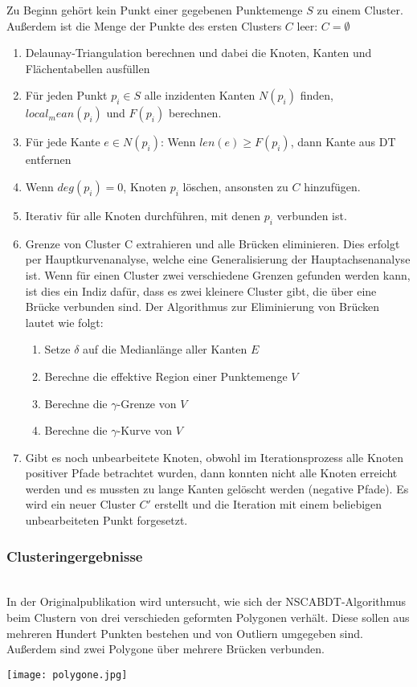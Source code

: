 \documentclass[11pt,ceqn]{book}
\begin{document}
Zu Beginn gehört kein Punkt einer gegebenen Punktemenge $S$ zu einem Cluster. Außerdem ist die Menge der Punkte des ersten Clusters $C$ leer: $C=\emptyset$
\begin{enumerate}
\item Delaunay-Triangulation berechnen und dabei die Knoten, Kanten und Flächentabellen ausfüllen
\item Für jeden Punkt $p_i \in S$ alle inzidenten Kanten $N(p_i)$ finden, $local_mean(p_i)$ und $F(p_i)$ berechnen.
\item Für jede Kante $e \in N(p_i)$: Wenn $len(e) \geqslant F(p_i)$, dann Kante aus DT entfernen
\item Wenn $deg(p_i)=0$, Knoten $p_i$ löschen, ansonsten zu $C$ hinzufügen.
\item Iterativ für alle Knoten durchführen, mit denen $p_i$ verbunden ist.
\item Grenze von Cluster C extrahieren und alle Brücken eliminieren. Dies erfolgt per Hauptkurvenanalyse, welche eine Generalisierung der Hauptachsenanalyse ist. Wenn für einen Cluster zwei verschiedene Grenzen gefunden werden kann, ist dies ein Indiz dafür, dass es zwei kleinere Cluster gibt, die über eine Brücke verbunden sind. Der Algorithmus zur Eliminierung von Brücken lautet wie folgt:
\begin{enumerate}
\item Setze $\delta$ auf die Medianlänge aller Kanten $E$
\item Berechne die effektive Region einer Punktemenge $V$
\item Berechne die $\gamma$-Grenze von $V$
\item Berechne die $\gamma$-Kurve von $V$
\end{enumerate}
\item Gibt es noch unbearbeitete Knoten, obwohl im Iterationsprozess alle Knoten positiver Pfade betrachtet wurden, dann konnten nicht alle Knoten erreicht werden und es mussten zu lange Kanten gelöscht werden (negative Pfade). Es wird ein neuer Cluster $C'$ erstellt und die Iteration mit einem beliebigen unbearbeiteten Punkt forgesetzt.
\end{enumerate}



\begin{minipage}{0.45\textwidth}\raggedright
\subsubsection{Clusteringergebnisse} ~\\
In der Originalpublikation wird untersucht, wie sich der NSCABDT-Algorithmus beim Clustern von drei verschieden geformten Polygonen verhält. Diese sollen aus mehreren Hundert Punkten bestehen und von Outliern umgegeben sind. Außerdem sind zwei Polygone über mehrere Brücken verbunden.
\end{minipage}
\hfill
\begin{minipage}{0.5\textwidth}
\texttt{[image: polygone.jpg]}
\end{minipage}
\end{document}
